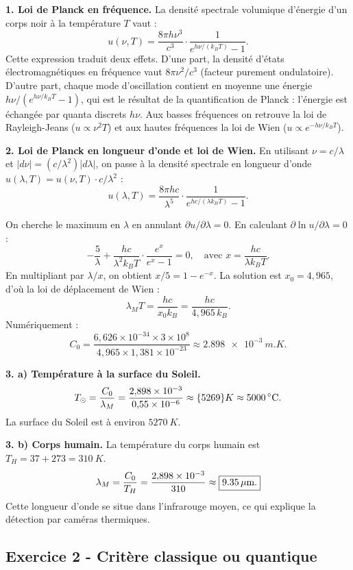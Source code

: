 \documentclass[12pt,a4paper]{article}
\begin{document}
\begin{boitecorrige}
\textbf{1. Loi de Planck en fréquence.}
La densité spectrale volumique d'énergie d'un corps noir à la température $T$ vaut :
\[
  u(\nu, T) = \frac{8\pi h\nu^3}{c^3}\cdot\frac{1}{e^{h\nu/(k_BT)}-1}.
\]
Cette expression traduit deux effets. D'une part, la densité d'états électromagnétiques en
fréquence vaut $8\pi\nu^2/c^3$ (facteur purement ondulatoire). D'autre part, chaque mode
d'oscillation contient en moyenne une énergie $h\nu/(e^{h\nu/k_BT}-1)$, qui est le résultat de la
quantification de Planck : l'énergie est échangée par quanta discrets $h\nu$. Aux basses fréquences
on retrouve la loi de Rayleigh-Jeans ($u\propto\nu^2 T$) et aux hautes fréquences la loi de Wien
($u\propto e^{-h\nu/k_BT}$).

\textbf{2. Loi de Planck en longueur d'onde et loi de Wien.}
En utilisant $\nu = c/\lambda$ et $|d\nu| = (c/\lambda^2)|d\lambda|$, on passe à la densité
spectrale en longueur d'onde $u(\lambda,T) = u(\nu,T)\cdot c/\lambda^2$ :
\[
  u(\lambda, T) = \frac{8\pi hc}{\lambda^5}\cdot\frac{1}{e^{hc/(\lambda k_BT)}-1}.
\]

On cherche le maximum en $\lambda$ en annulant $\partial u/\partial\lambda = 0$.
En calculant $\partial\ln u/\partial\lambda = 0$ :
\[
  -\frac{5}{\lambda} + \frac{hc}{\lambda^2 k_BT}\cdot\frac{e^{x}}{e^{x}-1} = 0,
  \quad \text{avec } x = \frac{hc}{\lambda k_BT}.
\]
En multipliant par $\lambda/x$, on obtient $x/5 = 1 - e^{-x}$.
La solution est $x_0 = 4{,}965$, d'où la loi de déplacement de Wien :
\[
  \lambda_M T = \frac{hc}{x_0 k_B} = \frac{hc}{4{,}965\,k_B}.
\]
Numériquement :
\[
  C_0 = \frac{6{,}626\times10^{-34}\times3\times10^{8}}{4{,}965\times1{,}381\times10^{-23}}
      \approx \boxed{\qty{2.898e-3}{m.K}.}
\]

\textbf{3. a) Température à la surface du Soleil.}
\[
  T_\odot = \frac{C_0}{\lambda_M} = \frac{2{,}898\times10^{-3}}{0{,}55\times10^{-6}}
           \approx \qty{5269}{K} \approx \num{5000}\,{}^\circ\text{C}.
\]
La surface du Soleil est à environ $\qty{5270}{K}$.

\textbf{3. b) Corps humain.}
La température du corps humain est $T_H = 37+273 = \qty{310}{K}$.
\[
  \lambda_M = \frac{C_0}{T_H} = \frac{2{,}898\times10^{-3}}{310}
            \approx \boxed{\num{9.35}\,\mu\text{m}.}
\]
Cette longueur d'onde se situe dans l'infrarouge moyen, ce qui explique la détection par caméras
thermiques.
\end{boitecorrige}

\subsection*{Exercice 2 - Critère classique ou quantique \niveau{\facile}}
\end{document}
